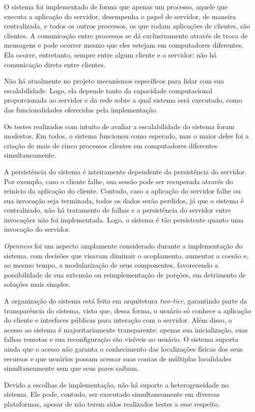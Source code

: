 \documentclass[../main.tex]{subfiles}
\begin{document}
O sistema foi implementado de forma que apenas um processo, aquele que executa a aplicação do servidor, desempenha o papel de servidor, de maneira centralizada, e todos os outros processos, os que rodam aplicações de clientes, são clientes.
A comunicação entre processos se dá exclusivamente através de troca de mensagens e pode ocorrer mesmo que eles estejam em computadores diferentes.
Ela ocorre, entretanto, sempre entre algum cliente e o servidor: não há comunicação direta entre clientes.

Não há atualmente no projeto mecanismos específicos para lidar com sua escalabilidade.
Logo, ela depende tanto da capacidade computacional proporcionada ao servidor e da rede sobre a qual sistema será executado, como das funcionalidades oferecidas pela implementação.

Os testes realizados com intuito de avaliar a escalabilidade do sistema foram modestos.
Em todos, o sistema funcionou como esperado, mas o maior deles foi a criação de mais de cinco processos clientes em computadores diferentes simultaneamente.

A persistência do sistema é inteiramente dependente da persistência do servidor.
Por exemplo, caso o cliente falhe, sua sessão pode ser recuperada através do reinício da aplicação do cliente.
Contudo, caso a aplicação do servidor falhe ou sua invocação seja terminada, todos os dados serão perdidos, já que o sistema é centralizado, não há tratamento de falhas e a persistência do servidor entre invocações não foi implementada.
Logo, o sistema é tão persistente quanto uma invocação do servidor.

\textit{Openness} foi um aspecto amplamente considerado durante a implementação do sistema, com decisões que visavam diminuir o acoplamento, aumentar a coesão e, ao mesmo tempo, a modularização de seus componentes, favorecendo a possibilidade de sua extensão ou reimplementação de porções, em detrimento de soluções mais simples.

A organização do sistema está feita em arquitetura \textit{two-tier}, garantindo parte da transparência do sistema, visto que, dessa forma, o usuário só conhece a aplicação do cliente e interfaces públicas para interação com o servidor.
Além disso, o acesso ao sistema é majoritariamente transparente: apenas sua inicialização, suas falhas remotas e sua reconfiguração são visíveis ao usuário.
O sistema suporta ainda que o acesso não garanta o conhecimento das localizações físicas dos seus recursos e que usuários possam acessar suas contas de múltiplas localidades simultaneamente sem que seus pares saibam.

Devido a escolhas de implementação, não há suporte a heterogeneidade no sistema.
Ele pode, contudo, ser executado simultaneamente em diversas plataformas, apesar de não terem sidos realizados testes a esse respeito.
\end{document}
